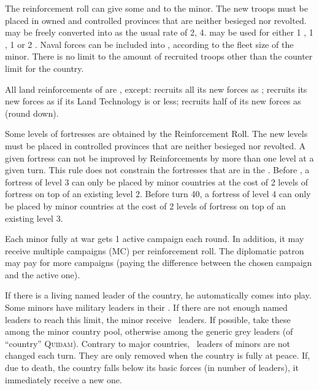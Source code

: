 \aparag[Troops]
\bparag The reinforcement roll can give some \LD and \ND to the minor. The new
troops must be placed in owned and controlled provinces that are neither
besieged nor revolted.
\bparag \LD may be freely converted into \ARMY as the usual rate of
2\ARMY\facemoins, 4\ARMY\faceplus.
\bparag \ND may be used for either 1 \NWD, 1 \NTD, 1 \VGD or 2 \NGD.
\bparag Naval forces can be included into \FLEET, according to the fleet size
of the minor.
\bparag There is no limit to the amount of recruited troops other than the
counter limit for the country.

\aparag[Moral]
\bparag All land reinforcements of \MIN are , except:
\bparag \paysSuede recruits all its new forces as ;
\bparag \paysSuisse recruits its new forces as  if its Land
Technology is \TMUS or less;
\bparag \paysPerse recruits half of its new forces as  (round
down).

\aparag[Fortresses.] Some levels of fortresses are obtained by the
Reinforcement Roll. The new levels must be placed in controlled provinces that
are neither besieged nor revolted.
\bparag A given fortress can not be improved by Reinforcements by more than
one level at a given turn. This rule does not constrain the fortresses that
are in the .
\bparag Before \TARQ, a fortress of level 3 can only be placed by minor
countries at the cost of 2 levels of fortress on top of an existing level 2.
\bparag Before turn 40, a fortress of level 4 can only be placed by minor
countries at the cost of 2 levels of fortress on top of an existing level 3.

\aparag[Campaigns]
\bparag Each minor fully at war gets 1 active campaign each round.
\bparag In addition, it may receive multiple campaigns (MC) per reinforcement
roll.
\bparag The diplomatic patron may pay for more campaigns (paying the
difference between the chosen campaign and the active one).

\bparag If there is a living named leader of the country, he automatically
comes into play.
\bparag Some minors have military leaders in their . If
there are not enough named leaders to reach this limit, the minor receive
\anonyme\ leaders. If possible, take these among the minor country pool,
otherwise among the generic grey leaders (of ``country'' \textsc{Quidam}).
\bparag Contrary to major countries, \anonyme\ leaders of minors are not
changed each turn. They are only removed when the country is fully at
peace. If, due to death, the country falls below its basic forces (in number
of leaders), it immediately receive a new one.

